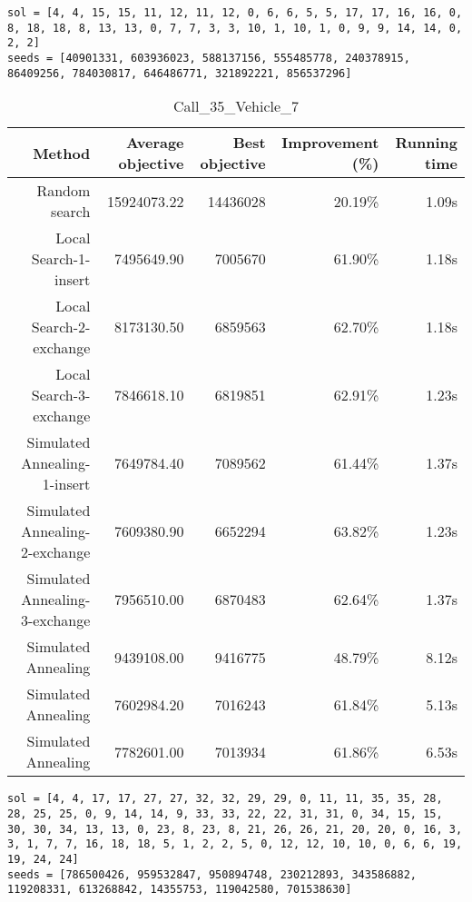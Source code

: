 \begin{lstlisting}[label={lst:call18vehicle5},caption=Optimal solution call\_18\_vehicle\_5]
sol = [4, 4, 15, 15, 11, 12, 11, 12, 0, 6, 6, 5, 5, 17, 17, 16, 16, 0, 8, 18, 18, 8, 13, 13, 0, 7, 7, 3, 3, 10, 1, 10, 1, 0, 9, 9, 14, 14, 0, 2, 2]
seeds = [40901331, 603936023, 588137156, 555485778, 240378915, 86409256, 784030817, 646486771, 321892221, 856537296]
\end{lstlisting}%
\clearpage


\begin{table}[ht]
\centering
\caption{Call\_35\_Vehicle\_7}
\label{tab:call35vehicle7}
\begin{tabular}{|r|r|r|r|r|}
Method & Average objective & Best objective & Improvement (\%) & Running time \\
\hline
Random search & 15924073.22 & 14436028 & 20.19\% & 1.09s\\
Local Search-1-insert & 7495649.90 & 7005670 & 61.90\% & 1.18s\\
Local Search-2-exchange & 8173130.50 & 6859563 & 62.70\% & 1.18s\\
Local Search-3-exchange & 7846618.10 & 6819851 & 62.91\% & 1.23s\\
Simulated Annealing-1-insert & 7649784.40 & 7089562 & 61.44\% & 1.37s\\
Simulated Annealing-2-exchange & 7609380.90 & 6652294 & 63.82\% & 1.23s\\
Simulated Annealing-3-exchange & 7956510.00 & 6870483 & 62.64\% & 1.37s\\
Simulated Annealing & 9439108.00 & 9416775 & 48.79\% & 8.12s\\
Simulated Annealing & 7602984.20 & 7016243 & 61.84\% & 5.13s\\
Simulated Annealing & 7782601.00 & 7013934 & 61.86\% & 6.53s\\
\end{tabular}%
\end{table}
\begin{lstlisting}[label={lst:call35vehicle7},caption=Optimal solution call\_35\_vehicle\_7]
sol = [4, 4, 17, 17, 27, 27, 32, 32, 29, 29, 0, 11, 11, 35, 35, 28, 28, 25, 25, 0, 9, 14, 14, 9, 33, 33, 22, 22, 31, 31, 0, 34, 15, 15, 30, 30, 34, 13, 13, 0, 23, 8, 23, 8, 21, 26, 26, 21, 20, 20, 0, 16, 3, 3, 1, 7, 7, 16, 18, 18, 5, 1, 2, 2, 5, 0, 12, 12, 10, 10, 0, 6, 6, 19, 19, 24, 24]
seeds = [786500426, 959532847, 950894748, 230212893, 343586882, 119208331, 613268842, 14355753, 119042580, 701538630]
\end{lstlisting}%
\clearpage


